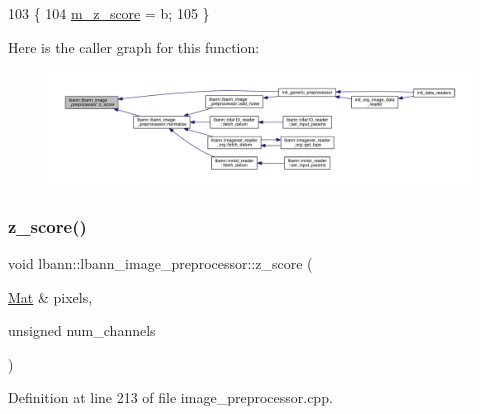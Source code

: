 \begin{DoxyCode}
103                        \{
104     \hyperlink{classlbann_1_1lbann__image__preprocessor_a6abe54ada0cacf23e8ac8b6d113bd26b}{m\_z\_score} = b;
105   \}
\end{DoxyCode}
Here is the caller graph for this function\+:\nopagebreak
\begin{figure}[H]
\begin{center}
\leavevmode
\includegraphics[width=350pt]{classlbann_1_1lbann__image__preprocessor_a02cfd4d8c26a317540b587eb52cef0d5_icgraph}
\end{center}
\end{figure}
\mbox{\label{classlbann_1_1lbann__image__preprocessor_aec67fb0dc7a1f5d718d5bb2e226f9b7a}} 
\subsubsection{\texorpdfstring{z\+\_\+score()}{z\_score()}\hspace{0.1cm}{\footnotesize\ttfamily [2/2]}}
{\footnotesize\ttfamily void lbann\+::lbann\+\_\+image\+\_\+preprocessor\+::z\+\_\+score (\begin{DoxyParamCaption}\item[{\hyperlink{base_8hpp_a68f11fdc31b62516cb310831bbe54d73}{Mat} \&}]{pixels,  }\item[{unsigned}]{num\+\_\+channels }\end{DoxyParamCaption})\hspace{0.3cm}{\ttfamily [protected]}}



Definition at line 213 of file image\+\_\+preprocessor.\+cpp.


